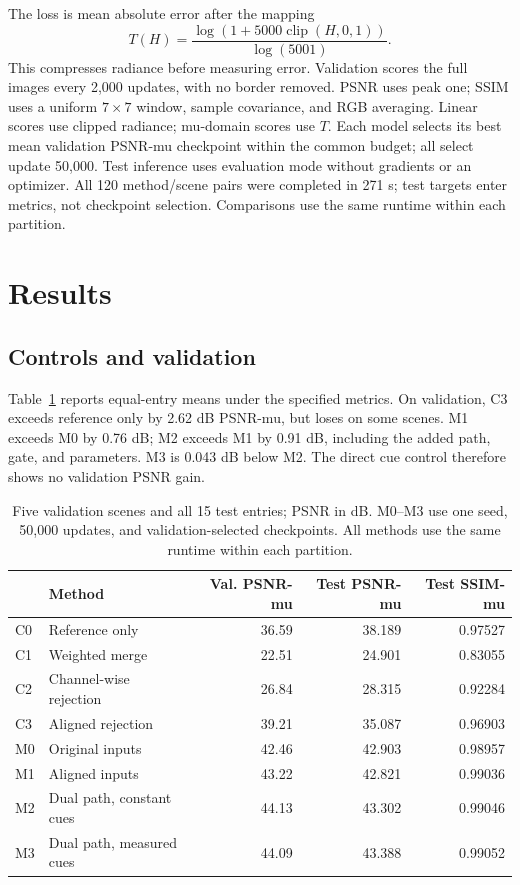 \documentclass{article}
\begin{document}
The loss is mean absolute error after the mapping
\begin{equation}
T(H)=\frac{\log(1+5000\operatorname{clip}(H,0,1))}{\log(5001)}.
\end{equation}
This compresses radiance before measuring error. Validation scores the full images every 2,000 updates, with no border removed. PSNR uses peak one; SSIM uses a uniform $7\times7$ window, sample covariance, and RGB averaging. Linear scores use clipped radiance; mu-domain scores use $T$. Each model selects its best mean validation PSNR-mu checkpoint within the common budget; all select update 50,000. Test inference uses evaluation mode without gradients or an optimizer. All 120 method/scene pairs were completed in 271 s; test targets enter metrics, not checkpoint selection. Comparisons use the same runtime within each partition.

\section{Results}
\subsection{Controls and validation}
Table~\ref{tab:results} reports equal-entry means under the specified metrics. On validation, C3 exceeds reference only by 2.62 dB PSNR-mu, but loses on some scenes. M1 exceeds M0 by 0.76 dB; M2 exceeds M1 by 0.91 dB, including the added path, gate, and parameters. M3 is 0.043 dB below M2. The direct cue control therefore shows no validation PSNR gain.

\begin{table}[t]
\centering
\small
\begin{tabular}{llrrr}
\hline
 & Method & Val. PSNR-mu & Test PSNR-mu & Test SSIM-mu \\
\hline
C0 & Reference only & 36.59 & 38.189 & 0.97527 \\
C1 & Weighted merge & 22.51 & 24.901 & 0.83055 \\
C2 & Channel-wise rejection & 26.84 & 28.315 & 0.92284 \\
C3 & Aligned rejection & 39.21 & 35.087 & 0.96903 \\
M0 & Original inputs & 42.46 & 42.903 & 0.98957 \\
M1 & Aligned inputs & 43.22 & 42.821 & 0.99036 \\
M2 & Dual path, constant cues & 44.13 & 43.302 & 0.99046 \\
M3 & Dual path, measured cues & 44.09 & 43.388 & 0.99052 \\
\hline
\end{tabular}
\caption{Five validation scenes and all 15 test entries; PSNR in dB. M0--M3 use one seed, 50,000 updates, and validation-selected checkpoints. All methods use the same runtime within each partition.}
\label{tab:results}
\end{table}
\end{document}
